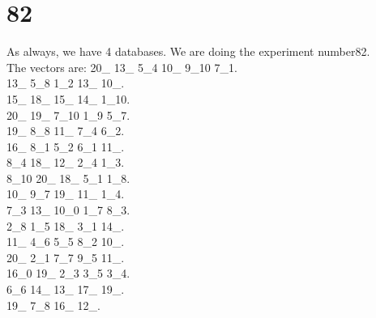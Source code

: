 \chapter{82}
\indent As always, we have 4 databases. We are doing the experiment number82.\\
The vectors are:
20\_ 13\_ 5\_4 10\_ 9\_10 7\_1.\\13\_ 5\_8 1\_2 13\_ 10\_.\\15\_ 18\_ 15\_ 14\_ 1\_10.\\20\_ 19\_ 7\_10 1\_9 5\_7.\\19\_ 8\_8 11\_ 7\_4 6\_2.\\16\_ 8\_1 5\_2 6\_1 11\_.\\8\_4 18\_ 12\_ 2\_4 1\_3.\\8\_10 20\_ 18\_ 5\_1 1\_8.\\10\_ 9\_7 19\_ 11\_ 1\_4.\\7\_3 13\_ 10\_0 1\_7 8\_3.\\2\_8 1\_5 18\_ 3\_1 14\_.\\11\_ 4\_6 5\_5 8\_2 10\_.\\20\_ 2\_1 7\_7 9\_5 11\_.\\16\_0 19\_ 2\_3 3\_5 3\_4.\\6\_6 14\_ 13\_ 17\_ 19\_.\\19\_ 7\_8 16\_ 12\_.\\